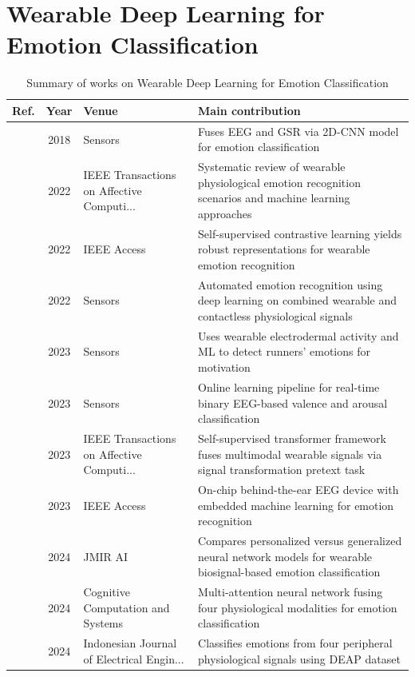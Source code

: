 \section{Wearable Deep Learning for Emotion Classification}\label{sec:theme3}
\begin{table}[!t]
\centering
\renewcommand{\arraystretch}{1.2}
\caption{Summary of works on Wearable Deep Learning for Emotion Classification}\label{tab:theme3}
\begin{tabularx}{\textwidth}{@{}l c p{3.6cm} X@{}}
\toprule
\textbf{Ref.} & \textbf{Year} & \textbf{Venue} & \textbf{Main contribution} \\
\midrule
\cite{kwon2018electroencephalography} & 2018 & Sensors & Fuses EEG and GSR via 2D-CNN model for emotion classification \\
\cite{saganowski2022emotion} & 2022 & IEEE Transactions on Affective Computi... & Systematic review of wearable physiological emotion recognition scenarios and machine learning approaches \\
\cite{dissanayake2022sigrep} & 2022 & IEEE Access & Self-supervised contrastive learning yields robust representations for wearable emotion recognition \\
\cite{filippini2022automated} & 2022 & Sensors & Automated emotion recognition using deep learning on combined wearable and contactless physiological signals \\
\cite{baldassarri2023wearables} & 2023 & Sensors & Uses wearable electrodermal activity and ML to detect runners' emotions for motivation \\
\cite{moontaha2023online} & 2023 & Sensors & Online learning pipeline for real-time binary EEG-based valence and arousal classification \\
\cite{wu2023transformer} & 2023 & IEEE Transactions on Affective Computi... & Self-supervised transformer framework fuses multimodal wearable signals via signal transformation pretext task \\
\cite{mai2023real} & 2023 & IEEE Access & On-chip behind-the-ear EEG device with embedded machine learning for emotion recognition \\
\cite{li2024comparison} & 2024 & JMIR AI & Compares personalized versus generalized neural network models for wearable biosignal-based emotion classification \\
\cite{zou2024emotion} & 2024 & Cognitive Computation and Systems & Multi-attention neural network fusing four physiological modalities for emotion classification \\
\cite{kumar2024machine} & 2024 & Indonesian Journal of Electrical Engin... & Classifies emotions from four peripheral physiological signals using DEAP dataset \\
\bottomrule
\end{tabularx}
\end{table}

